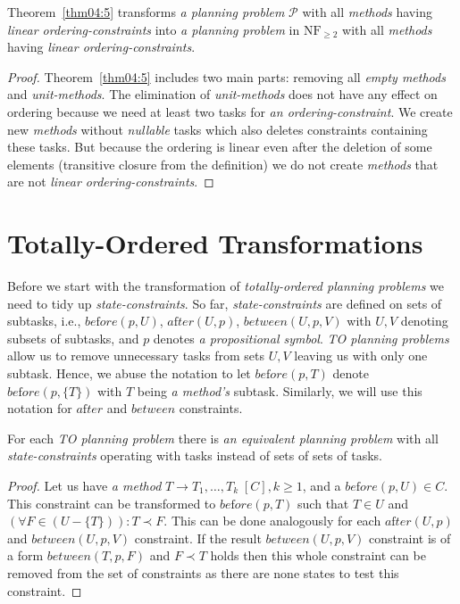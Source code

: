 \begin{thm}\label{thm04:7}
    Theorem~\ref{thm04:5} transforms \emph{a planning problem} $\mathcal{P}$ with all \emph{methods} having \emph{linear ordering-constraints} into \emph{a planning problem} in $\text{NF}_{\geq 2}$ with all \emph{methods} having \emph{linear ordering-constraints}.
\end{thm}
\begin{proof}
    Theorem~\ref{thm04:5} includes two main parts: removing all \emph{empty methods} and \emph{unit-methods}. The elimination of \emph{unit-methods} does not have any effect on ordering because we need at least two tasks for \emph{an ordering-constraint}. We create new \emph{methods} without \emph{nullable} tasks which also deletes constraints containing these tasks. But because the ordering is linear even after the deletion of some elements (transitive closure from the definition) we do not create \emph{methods} that are not \emph{linear ordering-constraints}.
\end{proof}

\section{Totally-Ordered Transformations}

\medskip\noindent
Before we start with the transformation of \emph{totally-ordered planning problems} we need to tidy up \emph{state-constraints}. So far, \emph{state-constraints} are defined on sets of subtasks, i.e., $be\text{f}ore(p, U)$, $a\text{f}ter(U, p)$, $between(U, p, V)$ with $U, V$ denoting subsets of subtasks, and $p$ denotes \emph{a propositional symbol}. \emph{TO planning problems} allow us to remove unnecessary tasks from sets $U, V$ leaving us with only one subtask. Hence, we abuse the notation to let $be\text{f}ore(p, T)$ denote $be\text{f}ore(p, \{ T \})$ with $T$ being \emph{a method's} subtask. Similarly, we will use this notation for $a\text{f}ter$ and $between$ constraints. 

\begin{thm}\label{thm04:8}
    For each \emph{TO planning problem} there is \emph{an equivalent planning problem} with all \emph{state-constraints} operating with tasks instead of sets of sets of tasks.
\end{thm}
\begin{proof}
    Let us have \emph{a method} $T \rightarrow T_1, \dots, T_k \; [C], k \geq 1$, and a $be\text{f}ore(p, U) \in C$. This constraint can be transformed to $be\text{f}ore(p, T)$ such that $T \in U$ and $(\forall F \in (U - \{ T \})): T \prec F$. This can be done analogously for each $a\text{f}ter(U, p)$ and $between(U, p, V)$ constraint. If the result $between(U, p, V)$ constraint is of a form $between(T, p, F)$ and $F \prec T$ holds then this whole constraint can be removed from the set of constraints as there are none states to test this constraint. 
\end{proof}

